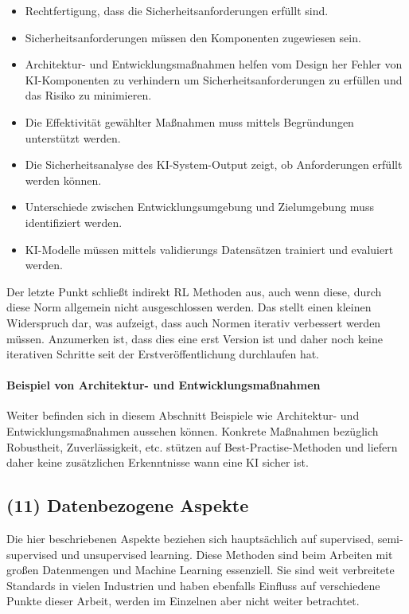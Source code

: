 \begin{itemize}
  \item Rechtfertigung, dass die Sicherheitsanforderungen erfüllt sind.
  \item Sicherheitsanforderungen müssen den Komponenten zugewiesen sein.
  \item Architektur- und Entwicklungsmaßnahmen helfen vom Design her Fehler von KI-Komponenten zu verhindern um Sicherheitsanforderungen zu erfüllen und das Risiko zu minimieren.
  \item Die Effektivität gewählter Maßnahmen muss mittels Begründungen unterstützt werden.
  \item Die Sicherheitsanalyse des KI-System-Output zeigt, ob Anforderungen erfüllt werden können.
  \item Unterschiede zwischen Entwicklungsumgebung und Zielumgebung muss identifiziert werden.
  \item KI-Modelle müssen mittels validierungs Datensätzen trainiert und evaluiert werden.
\end{itemize}

Der letzte Punkt schließt indirekt RL Methoden aus, auch wenn diese, durch diese Norm allgemein nicht ausgeschlossen werden. 
Das stellt einen kleinen Widerspruch dar, was aufzeigt, dass auch Normen iterativ verbessert werden müssen. Anzumerken ist, dass 
dies eine erst Version ist und daher noch keine iterativen Schritte seit der Erstveröffentlichung durchlaufen hat.

\paragraph{Beispiel von Architektur- und Entwicklungsmaßnahmen}
Weiter befinden sich in diesem Abschnitt Beispiele wie Architektur- und Entwicklungsmaßnahmen aussehen können. 
Konkrete Maßnahmen bezüglich Robustheit, Zuverlässigkeit, etc. stützen auf Best-Practise-Methoden und 
liefern daher keine zusätzlichen Erkenntnisse wann eine KI sicher ist.

\subsection{(11) Datenbezogene Aspekte}
Die hier beschriebenen Aspekte beziehen sich hauptsächlich auf supervised, semi-supervised und unsupervised learning. 
Diese Methoden sind beim Arbeiten mit großen Datenmengen und Machine Learning essenziell. 
Sie sind weit verbreitete Standards in vielen Industrien und haben ebenfalls Einfluss auf verschiedene Punkte 
dieser Arbeit, werden im Einzelnen aber nicht weiter betrachtet.

